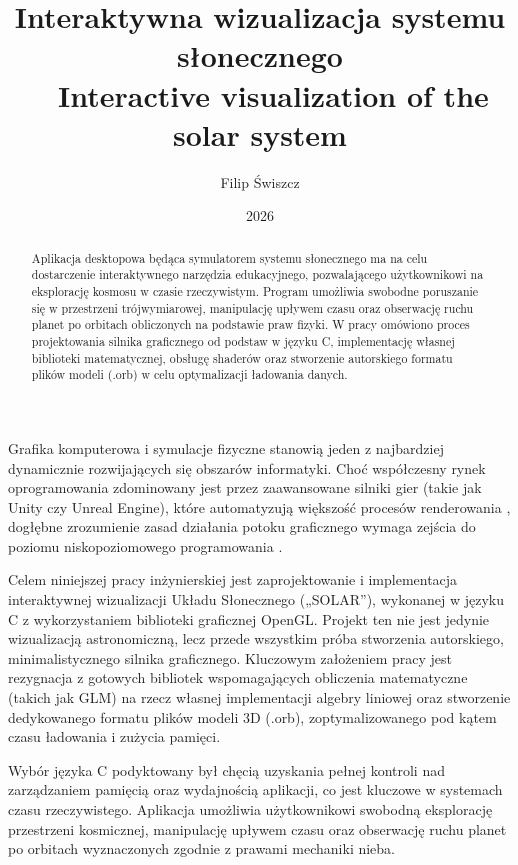 \documentclass[xodstep]{wnspt}
\author      {Filip Świszcz}
\date        {2026}
\title{Interaktywna wizualizacja systemu słonecznego \\{~} Interactive visualization of the solar system}
\begin{document}
\begin{abstract}
    Aplikacja desktopowa będąca symulatorem systemu słonecznego ma na celu dostarczenie interaktywnego narzędzia edukacyjnego, pozwalającego użytkownikowi na eksplorację kosmosu w czasie rzeczywistym. Program umożliwia swobodne poruszanie się w przestrzeni trójwymiarowej, manipulację upływem czasu oraz obserwację ruchu planet po orbitach obliczonych na podstawie praw fizyki. W pracy omówiono proces projektowania silnika graficznego od podstaw w języku C, implementację własnej biblioteki matematycznej, obsługę shaderów oraz stworzenie autorskiego formatu plików modeli (.orb) w celu optymalizacji ładowania danych.
\end{abstract}


\maketitle
\onehalfspacing

\introduction
Grafika komputerowa i symulacje fizyczne stanowią jeden z najbardziej dynamicznie rozwijających się obszarów informatyki. Choć współczesny rynek oprogramowania zdominowany jest przez zaawansowane silniki gier (takie jak Unity czy Unreal Engine), które automatyzują większość procesów renderowania \cite{book_gregory_game_engine}, dogłębne zrozumienie zasad działania potoku graficznego wymaga zejścia do poziomu niskopoziomowego programowania \cite{book_moller_real_time_rendering}.

Celem niniejszej pracy inżynierskiej jest zaprojektowanie i implementacja interaktywnej wizualizacji Układu Słonecznego („SOLAR”), wykonanej w języku C z wykorzystaniem biblioteki graficznej OpenGL. Projekt ten nie jest jedynie wizualizacją astronomiczną, lecz przede wszystkim próba stworzenia autorskiego, minimalistycznego silnika graficznego. Kluczowym założeniem pracy jest rezygnacja z gotowych bibliotek wspomagających obliczenia matematyczne (takich jak GLM) na rzecz własnej implementacji algebry liniowej oraz stworzenie dedykowanego formatu plików modeli 3D (.orb), zoptymalizowanego pod kątem czasu ładowania i zużycia pamięci.

Wybór języka C podyktowany był chęcią uzyskania pełnej kontroli nad zarządzaniem pamięcią oraz wydajnością aplikacji, co jest kluczowe w systemach czasu rzeczywistego. Aplikacja umożliwia użytkownikowi swobodną eksplorację przestrzeni kosmicznej, manipulację upływem czasu oraz obserwację ruchu planet po orbitach wyznaczonych zgodnie z prawami mechaniki nieba.
\end{document}

